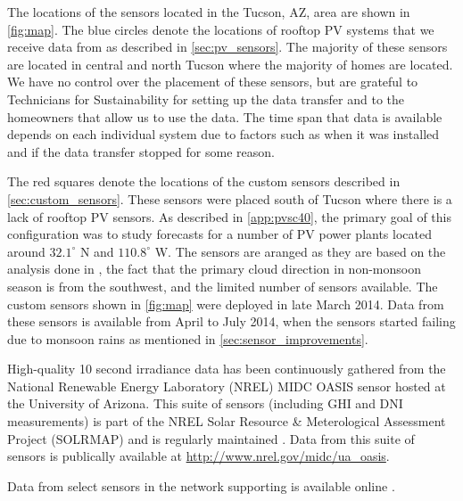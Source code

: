 The locations of the sensors located in the Tucson, AZ, area are shown
in \cref{fig:map}.
The blue circles denote the locations of rooftop PV systems that we
receive data from as described in \cref{sec:pv_sensors}.
The majority of these sensors are located in central and north Tucson
where the majority of homes are located.
We have no control over the placement of these sensors, but are
grateful to Technicians for Sustainability for setting up the data
transfer and to the homeowners that allow us to use the data.
The time span that data is available depends on each individual
system due to factors such as when it was installed and if the data
transfer stopped for some reason.

The red squares denote the locations of the custom sensors described
in \cref{sec:custom_sensors}.
These sensors were placed south of Tucson where there is a lack of
rooftop PV sensors.
As described in \cref{app:pvsc40}, the primary goal of this
configuration was to study forecasts for a number of PV power plants
located around $32.1^\circ$ N and $110.8^\circ$ W.
The sensors are aranged as they are based on the analysis done in
\cite{Lonij2013}, the fact that the primary cloud direction in
non-monsoon season is from the southwest, and the limited number of
sensors available.
The custom sensors shown in \cref{fig:map} were deployed in late March
2014.
Data from these sensors is available from April to July 2014, when the
sensors started failing due to monsoon rains as mentioned in
\cref{sec:sensor_improvements}.

High-quality 10 second irradiance data has been continuously gathered
from the National Renewable Energy Laboratory (NREL) MIDC OASIS sensor
hosted at the University of Arizona.
This suite of sensors (including GHI and DNI measurements) is part of
the NREL Solar Resource \& Meterological Assessment Project (SOLRMAP)
and is regularly maintained \citep{Wilcox_Andreas_2010}.
Data from this suite of sensors is publically available at
\url{http://www.nrel.gov/midc/ua_oasis}.

Data from select sensors in the network supporting
\cite{Lorenzo2015c,Lorenzo2017} is available online
\citep{Lorenzo2015b,Lorenzo2016b}.



